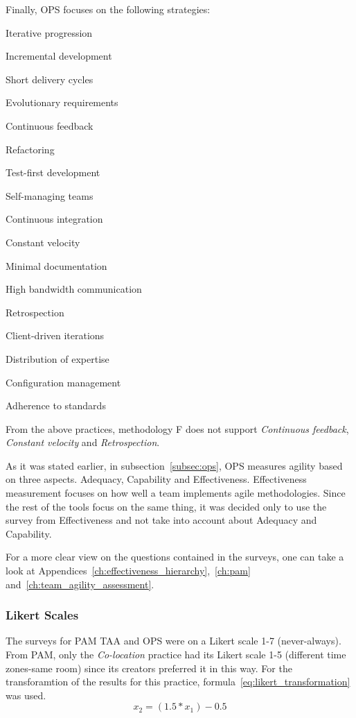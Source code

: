 Finally, OPS focuses on the following strategies:
\begin{inparaenum} [a\upshape)]
	\item Iterative progression
	\item Incremental development
	\item Short delivery cycles
	\item Evolutionary requirements
	\item Continuous feedback
	\item Refactoring
	\item Test-first development
	\item Self-managing teams
	\item Continuous integration
	\item Constant velocity
	\item Minimal documentation
	\item High bandwidth communication
	\item Retrospection
	\item Client-driven iterations
	\item Distribution of expertise
	\item Configuration management
	\item Adherence to standards

\end{inparaenum}
From the above practices, methodology F does not support \textit{Continuous feedback}, \textit{Constant velocity} and \textit{Retrospection}.%


As it was stated earlier, in subsection~\ref{subsec:ops}, OPS measures agility based on three aspects. Adequacy, Capability and Effectiveness. Effectiveness measurement focuses on how well a team implements agile methodologies. Since the rest of the tools focus on the same thing, it was decided only to use the survey from Effectiveness and not take into account about Adequacy and Capability.

For a more clear view on the questions contained in the surveys, one can take a look at Appendices~\ref{ch:effectiveness_hierarchy},~\ref{ch:pam} and~\ref{ch:team_agility_assessment}.

\subsubsection{Likert Scales}
The surveys for PAM TAA and OPS were on a Likert scale 1-7 (never-always). From PAM,  only the \textit{Co-location} practice had its Likert scale 1-5 (different time zones-same room) since its creators preferred it in this way. For the transforamtion of the results for this practice, formula~\eqref{eq:likert_transformation} \cite{likert_transformation} was used.  \begin{equation} \label{eq:likert_transformation} x_2 = (1.5 * x_1) - 0.5 \end{equation} 

